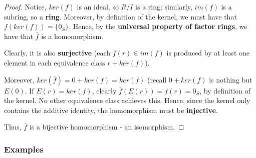 \documentclass{exam}
\begin{document}

\begin{proof}

Notice, $ker(f)$ is an ideal, so $R / I$ is a ring; similarly, $im(f)$ is a subring, so a \textbf{ring}. Moreover, by definition of the kernel, we must have that $f(ker(f)) = \{0_S\}$. Hence, by the  \textbf{universal property of factor rings}, we have that $\bar{f}$ is a homomorphism.

\bigskip

Clearly, it is also \textbf{surjective} (each $f(r) \in im(f)$ is produced by at least one element in each equivalence class $r + ker(f)$).

\bigskip

Moreover, $ker(\bar{f}) = 0 + ker(f) = ker(f)$ (recall $0 + ker(f)$ is nothing but $E(0)$. If $E(r) = ker(f)$, clearly $\bar{f}(E(r)) = f(r) = 0_S$, by definition of the kernel. No other equivalence class achieves this. Hence, since the kernel only contains the additive identity, the homomorphism must be \textbf{injective}.

\bigskip

Thus, $\bar{f}$ is a bijective homomorphism - an isomorphism.

\end{proof}

\subsubsection{Examples}
\end{document}
